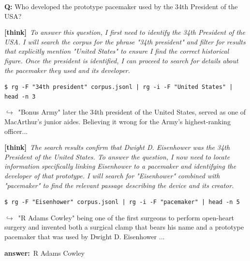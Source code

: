 \documentclass{llmxive}
\providecommand{\thk}[1]{{\footnotesize\textbf{[think]}\ \textit{#1}\par}}
\providecommand{\cmd}[1]{{\footnotesize\texttt{\$\ #1}\par}}
\providecommand{\retr}[1]{{\footnotesize\quad$\hookrightarrow$\ #1\par}}
\providecommand{\ans}[1]{{\footnotesize\textbf{answer:}\ #1\par}}
\begin{document}
\begin{sftbox}[label={ex:sft-pacemaker},title={\textsc{compositional (2 hop)}}]
\textbf{Q:} Who developed the prototype pacemaker used by the 34th President of the USA?\\[1pt]
  \thk{To answer this question, I first need to identify the 34th President of the USA. I will search the corpus for the phrase "34th president" and filter for results that explicitly mention "United States" to ensure I find the correct historical figure. Once the president is identified, I can proceed to search for details about the pacemaker they used and its developer.}
  \cmd{rg -F "34th president" corpus.jsonl | rg -i -F "United States" | head -n 3}
  \retr{"Bonus Army" later the 34th president of the United States, served as one of MacArthur's junior aides. Believing it wrong for the Army's highest-ranking officer...}
  \thk{The search results confirm that Dwight D. Eisenhower was the 34th President of the United States. To answer the question, I now need to locate information specifically linking Eisenhower to a pacemaker and identifying the developer of that prototype. I will search for "Eisenhower" combined with "pacemaker" to find the relevant passage describing the device and its creator.}
  \cmd{rg -F "Eisenhower" corpus.jsonl | rg -i -F "pacemaker" | head -n 5}
  \retr{"R Adams Cowley" being one of the first surgeons to perform open-heart surgery and invented both a surgical clamp that bears his name and a prototype pacemaker that was used by Dwight D. Eisenhower ...}
  \ans{R Adams Cowley}
\end{sftbox}\medskip
\end{document}
